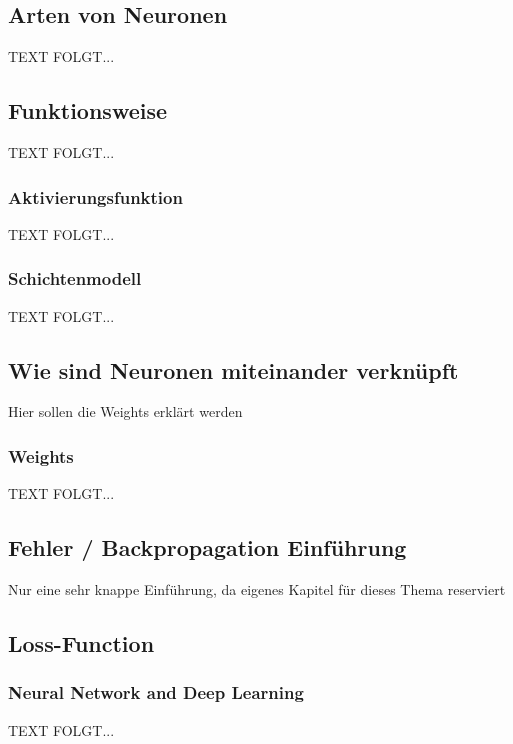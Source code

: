  \subsection{Arten von Neuronen}\label{arten_von_neuronen}
  TEXT FOLGT... 


\newpage
\subsection{Funktionsweise}\label{Funktionsweise}
  TEXT FOLGT... 
 

\newpage
\subsubsection{Aktivierungsfunktion}\label{Aktivierungsfunktion}
  
  TEXT FOLGT... 


\newpage
\subsubsection{Schichtenmodell}\label{Schichtenmodell}
  TEXT FOLGT... 

\newpage 
\subsection{Wie sind Neuronen miteinander verknüpft}\label{kap_verknuepfung_neuronen}  
%
Hier sollen die Weights erklärt werden

\subsubsection{Weights}\label{Weights}
  TEXT FOLGT... 

\subsection{Fehler / Backpropagation Einführung}\label{kap_fehler_backpropagation}
Nur eine sehr knappe Einführung, da eigenes Kapitel für dieses Thema reserviert


\subsection{Loss-Function}

\subsubsection{Neural Network and Deep Learning}\label{NN_deeplearning}
  TEXT FOLGT... 